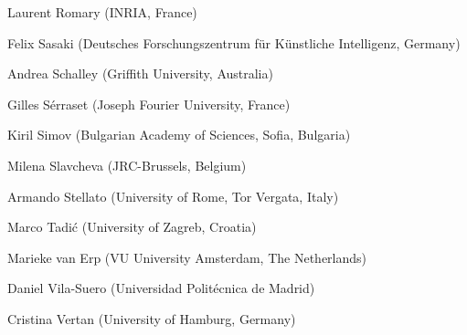 \documentclass[11pt]{article}
\begin{document}
\begin{figure*}[t]
\begin{minipage}{\textwidth}
    Laurent Romary (INRIA, France)																%
	
    Felix Sasaki (Deutsches Forschungszentrum für Künstliche Intelligenz, Germany)				%
	
    Andrea Schalley (Griffith University, Australia)											%
	
    Gilles Sérraset (Joseph Fourier University, France)											%
	
    Kiril Simov (Bulgarian Academy of Sciences, Sofia, Bulgaria)								%
	
    Milena Slavcheva (JRC-Brussels, Belgium)													%
	
    Armando Stellato (University of Rome, Tor Vergata, Italy)									%
	
    Marco Tadi\'{c} (University of Zagreb, Croatia)												%
	
    Marieke van Erp (VU University Amsterdam, The Netherlands)									%
	
    Daniel Vila-Suero (Universidad Politécnica de Madrid)										%
	
    Cristina Vertan (University of Hamburg, Germany)											%
	

	
\end{minipage}
\end{figure*}
\pagebreak
\end{document}
